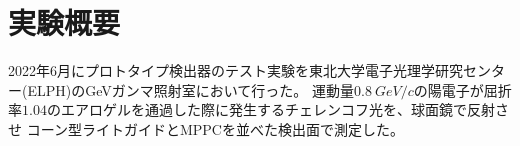 \section{実験概要}
2022年6月にプロトタイプ検出器のテスト実験を東北大学電子光理学研究センター(ELPH)のGeVガンマ照射室において行った。
運動量$\SI{0.8}{GeV/c}$の陽電子が屈折率$1.04$のエアロゲルを通過した際に発生するチェレンコフ光を、球面鏡で反射させ
コーン型ライトガイドとMPPCを並べた検出面で測定した。

